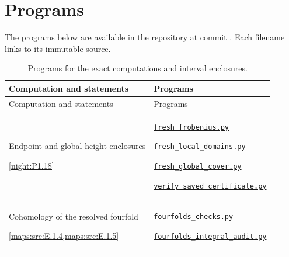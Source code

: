 \section*{Programs}
The programs below are available in the \href{https://github.com/KokunoYumeto/s6-complex-structure-workbench/tree/\SsixRepositoryCommit}{repository}
at commit \texttt{\SsixRepositoryCommit}. Each filename links to its immutable source.
\begingroup\small
\setlength{\tabcolsep}{4pt}
\begin{longtable}{@{}p{}p{}@{}}
\caption{Programs for the exact computations and interval enclosures.}\label{tab:V:programs}\\
\toprule Computation and statements & Programs \\\midrule
\endfirsthead
\toprule Computation and statements & Programs \\\midrule
\endhead
\bottomrule\endfoot
\hypertarget{prog:V:height}{}Endpoint and global height enclosures\par \cref{night:P1.18} &
\href{https://github.com/KokunoYumeto/s6-complex-structure-workbench/blob/\SsixRepositoryCommit/pro_returns/S6_SERIES_GRIND_checkpoint_10_20261120T0211Z/code/paper_v/fresh_frobenius.py}{\nolinkurl{fresh_frobenius.py}}\par \href{https://github.com/KokunoYumeto/s6-complex-structure-workbench/blob/\SsixRepositoryCommit/pro_returns/S6_SERIES_GRIND_checkpoint_10_20261120T0211Z/code/paper_v/fresh_local_domains.py}{\nolinkurl{fresh_local_domains.py}}\par \href{https://github.com/KokunoYumeto/s6-complex-structure-workbench/blob/\SsixRepositoryCommit/pro_returns/S6_SERIES_GRIND_checkpoint_10_20261120T0211Z/code/paper_v/fresh_global_cover.py}{\nolinkurl{fresh_global_cover.py}}\par \href{https://github.com/KokunoYumeto/s6-complex-structure-workbench/blob/\SsixRepositoryCommit/pro_returns/S6_SERIES_GRIND_checkpoint_10_20261120T0211Z/code/paper_v/verify_saved_certificate.py}{\nolinkurl{verify_saved_certificate.py}} \\[3pt]
\hypertarget{prog:V:resolved}{}Cohomology of the resolved fourfold\par \cref{maps:src:E.1.4,maps:src:E.1.5} &
\href{https://github.com/KokunoYumeto/s6-complex-structure-workbench/blob/\SsixRepositoryCommit/pro_returns/S6_10_PAPERS_checkpoint_15_20261119T1045Z/S6_10_PAPERS/code/V/replay_chains/code/fourfolds_checks.py}{\nolinkurl{fourfolds_checks.py}}\par \href{https://github.com/KokunoYumeto/s6-complex-structure-workbench/blob/\SsixRepositoryCommit/pro_returns/S6_10_PAPERS_checkpoint_15_20261119T1045Z/S6_10_PAPERS/code/V/replay_chains/code/fourfolds_integral_audit.py}{\nolinkurl{fourfolds_integral_audit.py}} \\[3pt]

\end{longtable}
